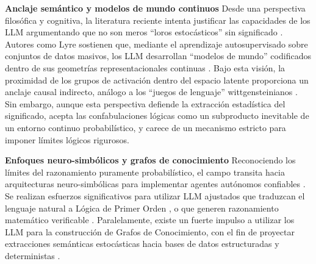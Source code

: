 \documentclass{article}
\begin{document}
\textbf{Anclaje semántico y modelos de mundo continuos} Desde una
perspectiva filosófica y cognitiva, la literatura reciente intenta
justificar las capacidades de los LLM argumentando que no son meros
``loros estocásticos'' sin significado \citep{bender2020}. Autores como
Lyre sostienen que, mediante el aprendizaje autosupervisado sobre
conjuntos de datos masivos, los LLM desarrollan ``modelos de mundo''
codificados dentro de sus geometrías representacionales continuas
\citep{lyre2024understanding}. Bajo esta visión, la proximidad de los
grupos de activación dentro del espacio latente proporciona un anclaje
causal indirecto, análogo a los ``juegos de lenguaje'' wittgensteinianos
\citep{lyre2024understanding}. Sin embargo, aunque esta perspectiva
defiende la extracción estadística del significado, acepta las
confabulaciones lógicas como un subproducto inevitable de un entorno
continuo probabilístico, y carece de un mecanismo estricto para imponer
límites lógicos rigurosos.

\textbf{Enfoques neuro-simbólicos y grafos de conocimiento} Reconociendo
los límites del razonamiento puramente probabilístico, el campo transita
hacia arquitecturas neuro-simbólicas para implementar agentes autónomos
confiables \citep{ibrahim2026, ferrone2019}. Se realizan esfuerzos
significativos para utilizar LLM ajustados que traduzcan el lenguaje
natural a Lógica de Primer Orden
\citep{vossel2025advancing, liu2025code4logic}, o que generen
razonamiento matemático verificable \citep{symcode2025}. Paralelamente,
existe un fuerte impulso a utilizar los LLM para la construcción de
Grafos de Conocimiento, con el fin de proyectar extracciones semánticas
estocásticas hacia bases de datos estructuradas y deterministas
\citep{choi2025knowledge, bian2025llm}.
\end{document}
